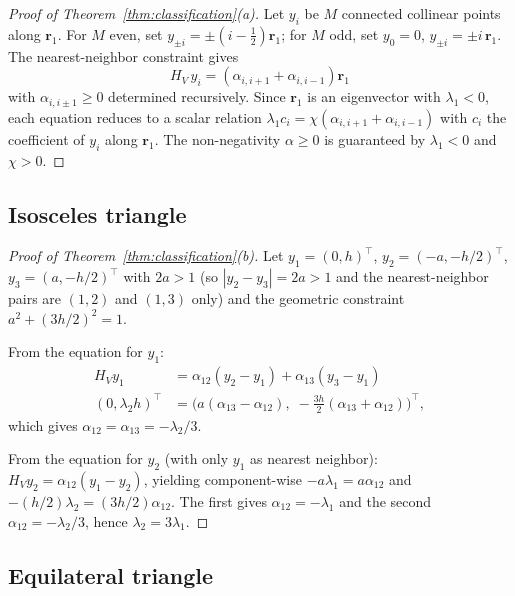 \documentclass[11pt]{article}
\theoremstyle{plain}%
\theoremstyle{definition}%
\theoremstyle{definition}%
\theoremstyle{remark}%
\numberwithin{equation}{section}
\newcommand{\HV}{H_V}
\begin{document}
\begin{proof}[Proof of Theorem~\ref{thm:classification}(a)]
Let $y_i$ be $M$ connected collinear points along $\boldsymbol{r}_1$. For $M$ even, set $y_{\pm i}=\pm(i-\frac{1}{2})\boldsymbol{r}_1$; for $M$ odd, set $y_0=0$, $y_{\pm i}=\pm i\,\boldsymbol{r}_1$. The nearest-neighbor constraint gives
\[
\HV\,y_i = (\alpha_{i,i+1}+\alpha_{i,i-1})\boldsymbol{r}_1
\]
with $\alpha_{i,i\pm 1}\geq 0$ determined recursively. Since $\boldsymbol{r}_1$ is an eigenvector with $\lambda_1<0$, each equation reduces to a scalar relation $\lambda_1 c_i = \chi(\alpha_{i,i+1}+\alpha_{i,i-1})$ with $c_i$ the coefficient of $y_i$ along $\boldsymbol{r}_1$. The non-negativity $\alpha\geq 0$ is guaranteed by $\lambda_1<0$ and $\chi>0$.
\end{proof}


\subsection{Isosceles triangle}\label{subsec:isosceles}

\begin{proof}[Proof of Theorem~\ref{thm:classification}(b)]
Let $y_1=(0,h)^\intercal$, $y_2=(-a,-h/2)^\intercal$, $y_3=(a,-h/2)^\intercal$ with $2a>1$ (so $|y_2-y_3|=2a>1$ and the nearest-neighbor pairs are $(1,2)$ and $(1,3)$ only) and the geometric constraint $a^2+(3h/2)^2=1$.

From the equation for $y_1$:
\begin{align*}
\HV y_1 &= \alpha_{12}(y_2-y_1)+\alpha_{13}(y_3-y_1) \\
(0,\lambda_2 h)^\intercal &= \bigl(a(\alpha_{13}-\alpha_{12}),\;-\tfrac{3h}{2}(\alpha_{13}+\alpha_{12})\bigr)^\intercal,
\end{align*}
which gives $\alpha_{12}=\alpha_{13}=-\lambda_2/3$.

From the equation for $y_2$ (with only $y_1$ as nearest neighbor):
$\HV y_2 = \alpha_{12}(y_1-y_2)$,
yielding component-wise $-a\lambda_1=a\alpha_{12}$ and $-(h/2)\lambda_2=(3h/2)\alpha_{12}$. The first gives $\alpha_{12}=-\lambda_1$ and the second $\alpha_{12}=-\lambda_2/3$, hence $\lambda_2=3\lambda_1$.
\end{proof}


\subsection{Equilateral triangle}\label{subsec:equilateral}
\end{document}
